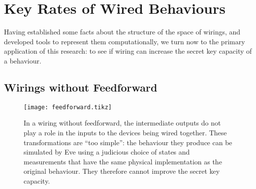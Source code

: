 \documentclass[10pt, a4paper]{article}
\numberwithin{equation}{section} %
\theoremstyle{definition}
\theoremstyle{plain}
\newcommand{\?}{\mathrel{?}} %
\begin{document}
                  \section{Key Rates of Wired Behaviours}\label{sec:krwir}

                  Having established some facts about the structure of the space of wirings, and developed tools to represent them computationally, we turn now to the primary application of this research: to see if wiring can increase the secret key capacity of a behaviour.

                  \subsection{Wirings without Feedforward}\label{sec:krwir_feedforward}


                  \begin{figure}
                    \centering
                    \texttt{[image: feedforward.tikz]}
                    \caption[Causal influences in a wiring without feedforward between two iid quantum behaviours.]{\label{fig:feedforward} In a wiring without feedforward, the intermediate outputs do not play a role in the inputs to the devices being wired together. These transformations are ``too simple'': the behaviour they produce can be simulated by Eve using a judicious choice of states and measurements that have the same physical implementation as the original behaviour. They therefore cannot improve the secret key capacity.}
                  \end{figure}
\end{document}
